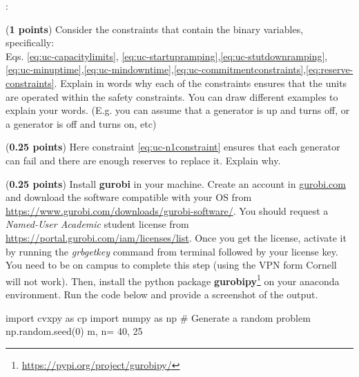 \documentclass[11pt]{exam}
\begin{document}
\begin{questions}
: 
\begin{parts}
\item (\textbf{1 points}) Consider the constraints that contain the binary variables, specifically:\\ Eqs. \eqref{eq:uc-capacitylimits}, \eqref{eq:uc-startupramping},\eqref{eq:uc-stutdownramping},\eqref{eq:uc-minuptime},\eqref{eq:uc-mindowntime},\eqref{eq:uc-commitmentconstraints},\eqref{eq:reserve-constraints}. Explain in words why each of the constraints ensures that the units are operated within the safety constraints. You can draw different examples to explain your words. (E.g. you can assume that a generator is up and turns off, or a generator is off and turns on, etc)
\item (\textbf{0.25 points}) Here constraint \eqref{eq:uc-n1constraint} ensures that each generator can fail and there are enough reserves to replace it. Explain why.
\item (\textbf{0.25 points}) Install \textbf{gurobi} in your machine. Create an account in \url{gurobi.com} and download the software compatible with your OS from \url{https://www.gurobi.com/downloads/gurobi-software/}. You should request a \textit{Named-User Academic} student license from \url{https://portal.gurobi.com/iam/licenses/list}. Once you get the license, activate it by running the \textit{grbgetkey} command from terminal followed by your license key. You need to be on campus to complete this step (using the VPN form Cornell will not work). Then, install the python package \textbf{gurobipy}\footnote{\url{https://pypi.org/project/gurobipy/}} on your anaconda environment. Run the code below and provide a screenshot of the output.
\begin{pyin}
import cvxpy as cp
import numpy as np
# Generate a random problem
np.random.seed(0)
m, n= 40, 25


\end{pyin}
\end{parts}
\end{questions}
\end{document}
